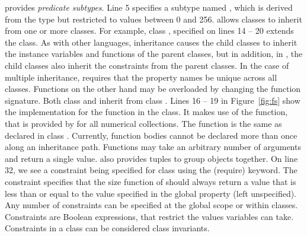 \noindent \Klang{} provides {\em predicate subtypes}. Line 5 specifies
a subtype named , which is derived from the  type
but restricted to values between 0 and 256. \Klang{} allows classes to
inherit from one or more classes. For example, class ,
specified on lines 14 -- 20 extends the  class. As with
other languages, inheritance causes the child classes to inherit the
instance variables and functions of the parent classes, but in
addition, in \Klang{}, the child classes also inherit the constraints
from the parent classes. In the case of multiple inheritance, \Klang{}
requires that the property names be unique across all
classes. Functions on the other hand may be overloaded by changing the
function signature. Both class  and  inherit from
class . Lines 16 -- 19 in Figure~\ref{fig:fs} show the
implementation for the  function in the 
class. It makes use of the  function, that is provided by
\Klang{} for all numerical collections. The  function is
the same as declared in class . Currently, function bodies
cannot be declared more than once along an inheritance path. Functions
may take an arbitrary number of arguments and return a single
value. \Klang{} also provides tuples to group objects together. On
line 32, we see a constraint being specified for class 
using the  (require) keyword. The constraint specifies that
the size function of  should always return a value that is
less than or equal to the value specified in the global property
 (left unspecified). Any number of constraints
can be specified at the global scope or within classes. Constraints
are Boolean expressions, that restrict the values variables can
take. Constraints in a class can be considered class invariants.


